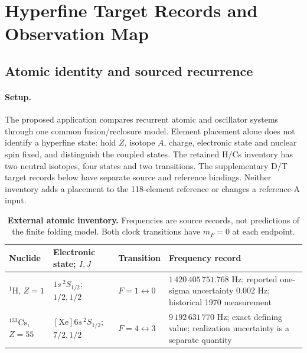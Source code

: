 \section{Hyperfine Target Records and Observation Map}\label{manual2:hyperfine-application}


\subsection{Atomic identity and sourced recurrence}
\paragraph{Setup.}
The proposed application compares recurrent atomic and oscillator systems through one common fusion/reclosure model. Element placement alone does not identify a hyperfine state: hold \(Z\), isotope \(A\), charge, electronic state and nuclear spin fixed, and distinguish the coupled states. The retained H/Cs inventory has two neutral isotopes, four states and two transitions. The supplementary D/T target records below have separate source and reference bindings. Neither inventory adds a placement to the 118-element reference or changes a reference-A input.

\begin{table}[H]
\centering\small
\caption{\textbf{External atomic inventory.} Frequencies are source records, not predictions of the finite folding model. Both clock transitions have \(m_F=0\) at each endpoint.}
\label{tab:manual2-hyperfine-inputs}
\begin{tabularx}{\textwidth}{@{}p{}p{}p{}X@{}}
\toprule
Nuclide & Electronic state; \(I,J\) & Transition & Frequency record\\
\midrule
\({}^{1}\mathrm H\), \(Z=1\) & \(1s\,{}^2S_{1/2}\); \(1/2,1/2\) & \(F=1\leftrightarrow0\) & \(1\,420\,405\,751.768\) Hz; reported one-sigma uncertainty \(0.002\) Hz; historical 1970 measurement\\
\({}^{133}\mathrm{Cs}\), \(Z=55\) & \([\mathrm{Xe}]6s\,{}^2S_{1/2}\); \(7/2,1/2\) & \(F=4\leftrightarrow3\) & \(9\,192\,631\,770\) Hz; exact defining value; realization uncertainty is a separate quantity\\
\bottomrule
\end{tabularx}
\end{table}

